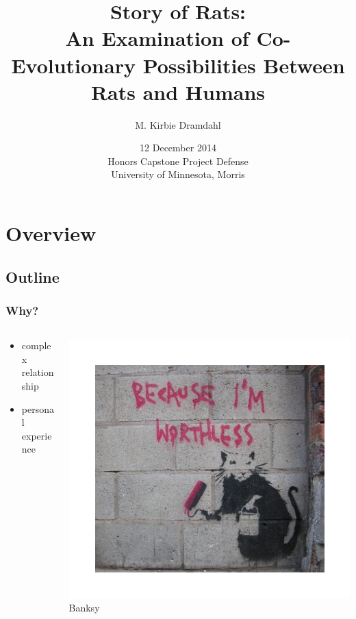 \documentclass{beamer}
\title[Story of Rats]{Story of Rats:\\
					  An Examination of Co-Evolutionary Possibilities Between Rats and Humans}
\author[Dramdahl]{M. Kirbie Dramdahl}
\institute[U of Minn, Morris]
{
  University of Minnesota, Morris \\
  Morris, Minnesota, USA
}
\date[Dec '14, Honors, UMM] %
{12 December 2014 \\ Honors Capstone Project Defense \\ University of Minnesota, Morris}
\begin{document}
\begin{frame}
  \titlepage
\end{frame}


\section*{Overview}

\subsection*{Outline}

\begin{frame}
\frametitle{Why?}
\begin{columns}
\begin{column}{.4\textwidth}
\begin{itemize}
\item complex relationship
\item personal experience
\end{itemize}
\end{column}
\begin{column}{.6\textwidth}
\begin{center}
\includegraphics[width=1\textwidth,trim={0 .45in 0 .45in}]{BanksyRat}
\linebreak
{\tiny Banksy}
\end{center}
\end{column}
\end{columns}
\end{frame}
\end{document}
